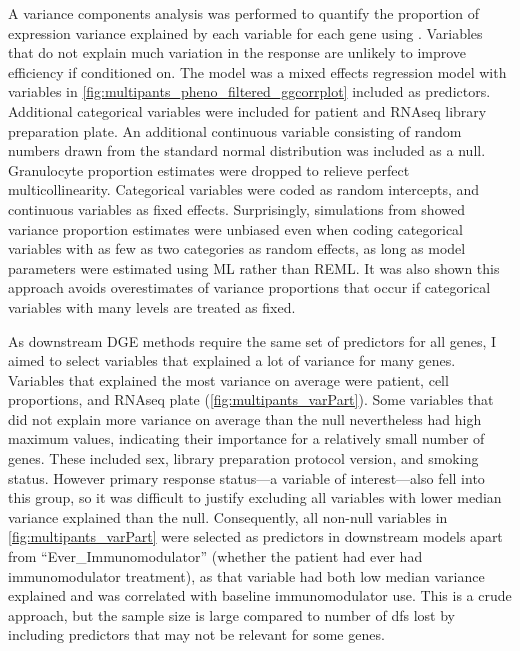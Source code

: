 A variance components analysis was performed to quantify the proportion of expression variance explained by each variable for each gene using  \autocite{hoffman2016VariancePartitionInterpretingDrivers}.
Variables that do not explain much variation in the response are unlikely to improve efficiency if conditioned on.
The model was a mixed effects regression model with variables in \cref{fig:multipants_pheno_filtered_ggcorrplot} included as predictors.
Additional categorical variables were included for patient and \gls{RNAseq} library preparation plate.
An additional continuous variable consisting of random numbers drawn from the standard normal distribution was included as a null.
Granulocyte proportion estimates were dropped to relieve perfect multicollinearity.
Categorical variables were coded as random intercepts, and continuous variables as fixed effects.
Surprisingly, simulations from \textcite{hoffman2016VariancePartitionInterpretingDrivers} showed variance proportion estimates were unbiased even when coding categorical variables with as few as two categories as random effects,
as long as model parameters were estimated using \gls{ML} rather than \gls{REML}. 
It was also shown this approach avoids overestimates of variance proportions that occur if categorical variables with many levels are treated as fixed.

As downstream \gls{DGE} methods require the same set of predictors for all genes, I aimed to select variables that explained a lot of variance for many genes.
Variables that explained the most variance on average were patient, cell proportions, and \gls{RNAseq} plate (\cref{fig:multipants_varPart}).
Some variables that did not explain more variance on average than the null nevertheless had high maximum values, indicating their importance for a relatively small number of genes.
These included sex, library preparation protocol version, and smoking status.
However primary response status---a variable of interest---also fell into this group,
so it was difficult to justify excluding all variables with lower median variance explained than the null.
Consequently, all non-null variables in \cref{fig:multipants_varPart} were selected as predictors in downstream models apart from \enquote{Ever\_Immunomodulator} 
(whether the patient had ever had immunomodulator treatment), 
as that variable had both low median variance explained and was correlated with baseline immunomodulator use.
This is a crude approach, but the sample size is large compared to number of \glspl{df} lost by including predictors that may not be relevant for some genes.


